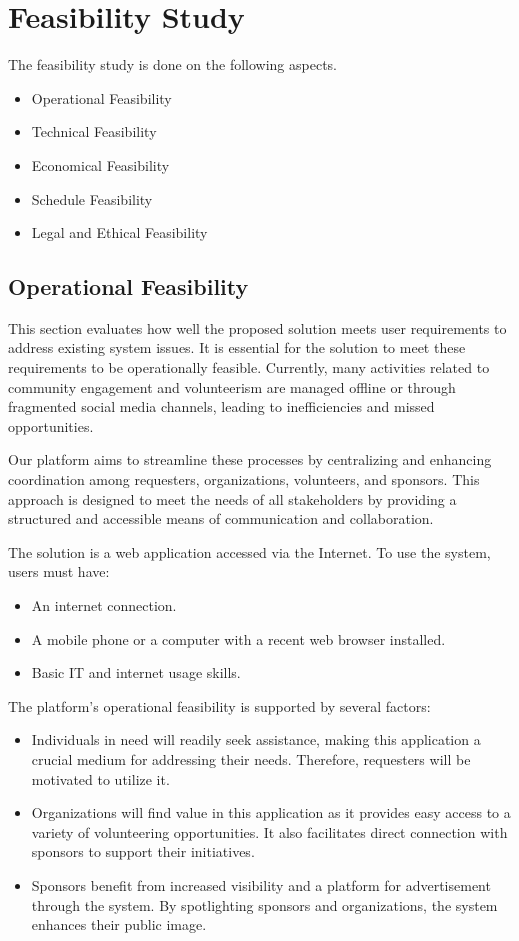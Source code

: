 \section{Feasibility Study}
The feasibility study is done on the following aspects.
\begin{itemize}
    \item Operational Feasibility
    \item Technical Feasibility
    \item Economical Feasibility
    \item Schedule Feasibility
    \item Legal and Ethical Feasibility
\end{itemize}

\subsection{Operational Feasibility}
This section evaluates how well the proposed solution meets user requirements to address existing system issues. It is essential for the solution to meet these requirements to be operationally feasible. Currently, many activities related to community engagement and volunteerism are managed offline or through fragmented social media channels, leading to inefficiencies and missed opportunities.

Our platform aims to streamline these processes by centralizing and enhancing coordination among requesters, organizations, volunteers, and sponsors. This approach is designed to meet the needs of all stakeholders by providing a structured and accessible means of communication and collaboration.

The solution is a web application accessed via the Internet. To use the system, users must have:
\begin{itemize}
\itemsep0em 
    \item An internet connection.
    \item A mobile phone or a computer with a recent web browser installed.
    \item Basic IT and internet usage skills.
\end{itemize}

The platform's operational feasibility is supported by several factors:

\begin{itemize}
\itemsep0em 
    \item Individuals in need will readily seek assistance, making this application a crucial medium for addressing their needs. Therefore, requesters will be motivated to utilize it.
    \item Organizations will find value in this application as it provides easy access to a variety of volunteering opportunities. It also facilitates direct connection with sponsors to support their initiatives.
    \item Sponsors benefit from increased visibility and a platform for advertisement through the system. By spotlighting sponsors and organizations, the system enhances their public image.

\end{itemize}

